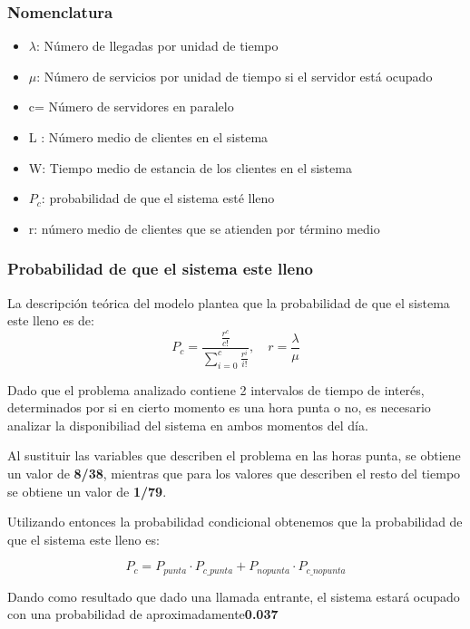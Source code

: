 \documentclass{article}
\begin{document}
				\subsubsection*{Nomenclatura}
					\begin{itemize}
						\item $\lambda$: Número de llegadas por unidad de tiempo
						\item $\mu$:  Número de servicios por unidad de tiempo si el servidor está ocupado
						\item c= Número de servidores en paralelo
						\item L : Número medio de clientes en el sistema
						\item W: Tiempo medio de estancia de los clientes en el sistema
						\item $P_c$:  probabilidad de que el sistema esté lleno
						\item r: número medio de clientes que se atienden por término medio
					\end{itemize}
			
			\subsubsection*{Probabilidad de que el sistema este lleno}
			La descripción teórica del modelo plantea que la probabilidad de que el sistema este lleno es de:
			 \[
			 P_c = \frac{\frac{r^c}{c!}}{\sum_{i=0}^{c} \frac{r^i}{i!}}, \quad 
			 r = \frac{\lambda}{\mu}
			 \]
			 
			Dado que el problema analizado contiene 2 intervalos de tiempo de interés, determinados por si en cierto momento es una hora punta o no, es necesario analizar la disponibiliad del sistema en ambos momentos del día.
			
			Al sustituir las variables que describen el problema en las horas punta, se obtiene un valor de \textbf{8/38}, mientras que para los valores que describen el resto del tiempo se obtiene un valor de \textbf{1/79}. 
			
			Utilizando entonces la probabilidad condicional obtenemos que la probabilidad de que el sistema este lleno es:
			
			\begin{equation}
				P_c = P_{punta}\cdot P_{c\_punta} + P_{nopunta} \cdot P_{c\_nopunta}
			\end{equation}
			
			 Dando como resultado que dado una llamada entrante, el sistema estará ocupado con una probabilidad de aproximadamente\textbf{0.037} 
			
\end{document}
